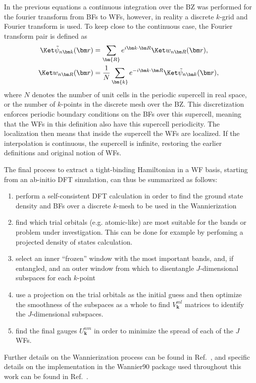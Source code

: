 In the previous equations a continuous integration over the BZ was performed for the fourier transform from BFs to WFs, however, in reality a discrete $k$-grid and Fourier transform is used.
To keep close to the continuous case, the Fourier transform pair is defined as
\begin{align}
	\tildeBlochKet{n} &= \sum_{\bm{R}} \eikr{R} \WanKet{n}{R},\\
	\WanKet{n}{R} &= \frac{1}{N}\sum_{\bm{k}} \inveikr{R} \tildeBlochKet{n},
\end{align}
where $N$ denotes the number of unit cells in the periodic supercell in real space, or the number of $k$-points in the discrete mesh over the BZ.
This discretization enforces periodic boundary conditions on the BFs over this supercell, meaning that the WFs in this definition also have this supercell periodicity.
The localization then means that inside the supercell the WFs are localized.
If the interpolation is continuous, the supercell is infinite, restoring the earlier definitions and original notion of WFs.

The final process to extract a tight-binding Hamiltonian in a WF basis, starting from an ab-initio DFT simulation, can thus be summarized as follows:
\begin{enumerate}
	\item perform a self-consistent DFT calculation in order to find the ground state density and BFs over a discrete $k$-mesh to be used in the Wannierization
	\item find which trial orbitals (e.g. atomic-like) are most suitable for the bands or problem under investigation. This can be done for example by perfoming a projected density of states calculation.
	\item select an inner ``frozen'' window with the most important bands, and, if entangled, and an outer window from which to disentangle $J$-dimensional subspaces for each $k$-point
	\item use a projection on the trial orbitals as the initial guess and then optimize the smoothness of the subspaces as a whole to find $V^{ml}_{\bm{k}}$ matrices to identify the $J$-dimensional subspaces.
	\item find the final gauges $U^{nm}_{\bm{k}}$ in order to minimize the spread of each of the $J$ WFs.
\end{enumerate}

Further details on the Wannierization process can be found in Ref.~\cite{Marzari2012}, and specific details on the implementation in the Wannier90 package used throughout this work can be found in Ref.~\cite{Mostofi2014AnFunctions}.

